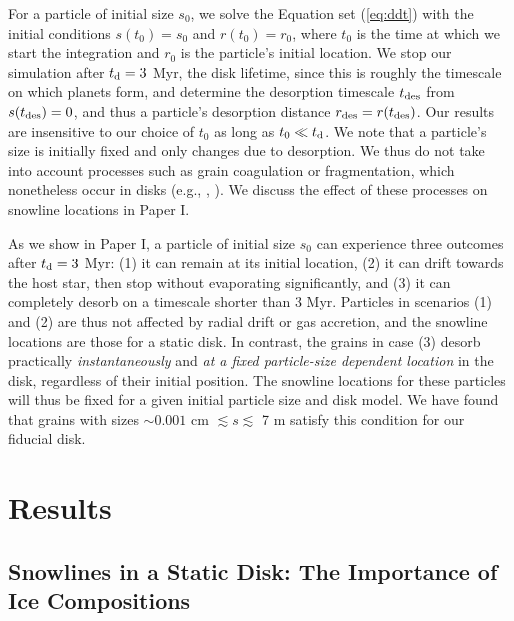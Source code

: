 \documentclass[apj]{emulateapj}
\newcommand{\emgr}[1]{\emph{ \color{gray} #1}}
\begin{document}
For a particle of initial size $s_0$, we solve the Equation set (\ref{eq:ddt}) with the initial conditions $s(t_0)=s_0$ and $r(t_0)=r_0$, where $t_0$ is the time at which we start the integration and $r_0$ is the particle's initial location. We stop our simulation after $t_{\rm d}=3$ Myr, the disk lifetime, since this is roughly the timescale on which planets form, and determine the desorption timescale $t_{\rm des}$ from $s(t_{\rm des})=0$, and thus a particle's desorption distance $r_{\rm des}=r(t_{\rm des})$. Our results are insensitive to our choice of $t_0$ as long as $t_0 \ll t_{\rm d}$. We note that a particle's size is initially fixed and only changes due to desorption. We thus do not take into account processes such as grain coagulation or fragmentation, which nonetheless occur in disks (e.g., \citealt{birnstiel12}, \citealt{perez12}). We discuss the effect of these processes on snowline locations in Paper I.

As we show in Paper I, a particle of initial size $s_0$ can experience three outcomes after $t_{\rm d}=3$ Myr: (1) it can remain at its initial location, (2) it can drift towards the host star, then stop without evaporating significantly, and (3) it can completely desorb on a timescale shorter than 3 Myr. Particles in scenarios (1) and (2) are thus not affected by radial drift or gas accretion, and the snowline locations are those for a static disk. In contrast, the grains in case (3) desorb practically \textit{instantaneously} and \textit{at a fixed particle-size dependent location} in the disk, regardless of their initial position. The snowline locations for these particles will thus be fixed for a given initial particle size and disk model. We have found that grains with sizes $\sim0.001$ cm $\lesssim s \lesssim$ 7 m satisfy this condition for our fiducial disk. 


\section{Results}
\label{sec:results}

\subsection{Snowlines in a Static Disk: The Importance of Ice Compositions}
\label{sec:snowlines}
\end{document}
